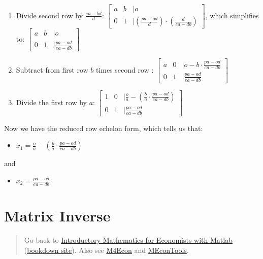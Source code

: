 \documentclass[
]{book}
\providecommand{\tightlist}{%
  \setlength{\itemsep}{0pt}\setlength{\parskip}{0pt}}
\begin{document}
\begin{enumerate}
\def\labelenumi{\arabic{enumi}.}
\item
  Divide second row by \(\frac{ea-bd}{d}\):
  \(\left\lbrack \begin{array}{ccl} a & b & |o\\ 0 & 1 & |\left(\frac{pa-od}{d}\right)\cdot \left(\frac{d}{ea-db}\right) \end{array}\right\rbrack\), which simplifies to:
  \(\left\lbrack \begin{array}{ccl} a & b & |o\\ 0 & 1 & |\frac{pa-od}{ea-db} \end{array}\right\rbrack\)
\item
  Subtract from first row \(b\) times second row :
  \(\left\lbrack \begin{array}{ccl} a & 0 & |o-b\cdot \frac{pa-od}{ea-db}\\ 0 & 1 & |\frac{pa-od}{ea-db} \end{array}\right\rbrack\)
\item
  Divide the first row by \(a\): \(\left\lbrack \begin{array}{ccl} 1 & 0 & |\frac{o}{a}-\left(\frac{b}{a}\cdot \frac{pa-od}{ea-db}\right)\\ 0 & 1 & |\frac{pa-od}{ea-db} \end{array}\right\rbrack\)
\end{enumerate}

Now we have the reduced row echelon form, which tells us that:

\begin{itemize}
\tightlist
\item
  \(\displaystyle x_1 =\frac{o}{a}-\left(\frac{b}{a}\cdot \frac{pa-od}{ea-db}\right)\)
\end{itemize}

and

\begin{itemize}
\tightlist
\item
  \(\displaystyle x_2 =\frac{pa-od}{ea-db}\)
\end{itemize}

\hypertarget{matrix-inverse}{%
\section{Matrix Inverse}\label{matrix-inverse}}

\begin{quote}
Go back to \href{https://math4econ.github.io/}{Introductory Mathematics for Economists with Matlab} (\href{https://math4econ.github.io/bookdown}{bookdown site}). Also see \href{http://fanwangecon.github.io/M4Econ}{M4Econ} and \href{https://fanwangecon.github.io/MEconTools/}{MEconTools}.
\end{quote}
\end{document}
